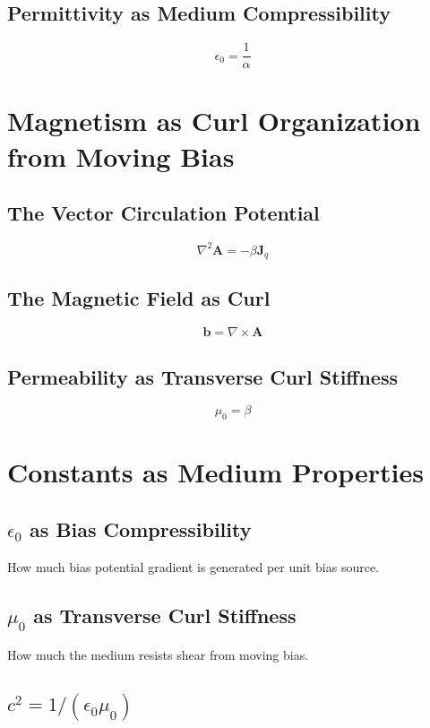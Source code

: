 \documentclass[12pt, a4paper]{article}
\begin{document}
\subsection{Permittivity as Medium Compressibility}
\[
\epsilon_0 = \frac{1}{\alpha}
\]

\section{Magnetism as Curl Organization from Moving Bias}

\subsection{The Vector Circulation Potential}
\[
\nabla^2 \mathbf{A} = -\beta \mathbf{J}_q
\]

\subsection{The Magnetic Field as Curl}
\[
\mathbf{b} = \nabla \times \mathbf{A}
\]

\subsection{Permeability as Transverse Curl Stiffness}
\[
\mu_0 = \beta
\]

\section{Constants as Medium Properties}

\subsection{\( \epsilon_0 \) as Bias Compressibility}

How much bias potential gradient is generated per unit bias source.

\subsection{\( \mu_0 \) as Transverse Curl Stiffness}

How much the medium resists shear from moving bias.

\subsection{\( c^2 = 1/(\epsilon_0 \mu_0) \)}
\end{document}
